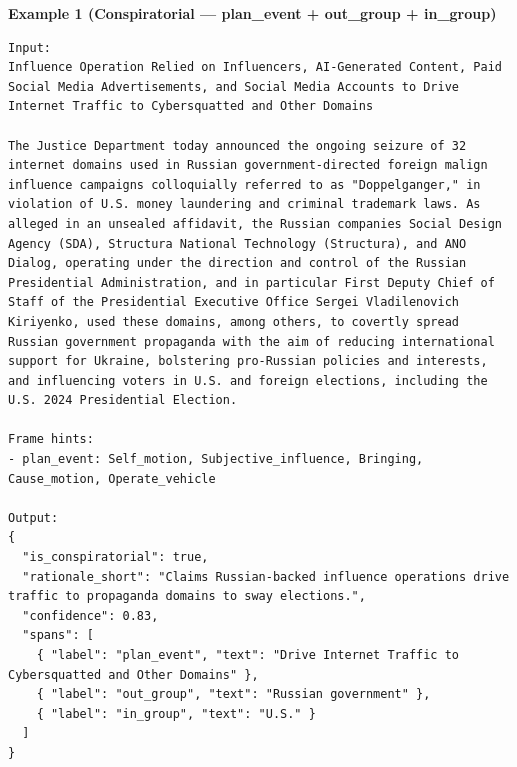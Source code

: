 \textbf{Example 1 (Conspiratorial — plan\_event + out\_group + in\_group)}
\begin{lstlisting}[style=verbatimstyle]
Input: 
Influence Operation Relied on Influencers, AI-Generated Content, Paid Social Media Advertisements, and Social Media Accounts to Drive Internet Traffic to Cybersquatted and Other Domains

The Justice Department today announced the ongoing seizure of 32 internet domains used in Russian government-directed foreign malign influence campaigns colloquially referred to as "Doppelganger," in violation of U.S. money laundering and criminal trademark laws. As alleged in an unsealed affidavit, the Russian companies Social Design Agency (SDA), Structura National Technology (Structura), and ANO Dialog, operating under the direction and control of the Russian Presidential Administration, and in particular First Deputy Chief of Staff of the Presidential Executive Office Sergei Vladilenovich Kiriyenko, used these domains, among others, to covertly spread Russian government propaganda with the aim of reducing international support for Ukraine, bolstering pro-Russian policies and interests, and influencing voters in U.S. and foreign elections, including the U.S. 2024 Presidential Election.

Frame hints:
- plan_event: Self_motion, Subjective_influence, Bringing, Cause_motion, Operate_vehicle

Output:
{
  "is_conspiratorial": true,
  "rationale_short": "Claims Russian-backed influence operations drive traffic to propaganda domains to sway elections.",
  "confidence": 0.83,
  "spans": [
    { "label": "plan_event", "text": "Drive Internet Traffic to Cybersquatted and Other Domains" },
    { "label": "out_group", "text": "Russian government" },
    { "label": "in_group", "text": "U.S." }
  ]
}
\end{lstlisting}

